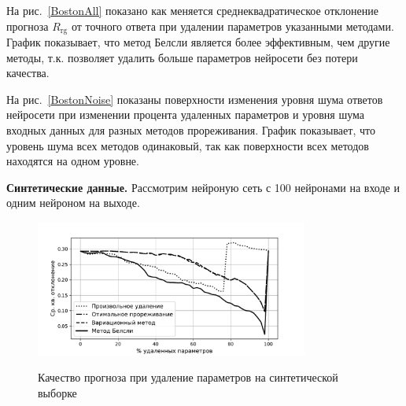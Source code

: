 На рис.~\ref{BostonAll} показано как меняется среднеквадратическое отклонение прогноза $R_{\text{rg}}$ от точного ответа  при удалении параметров указанными методами. График показывает, что метод Белсли является более эффективным, чем другие методы, т.к. позволяет удалить больше параметров нейросети без потери качества.

На рис.~\ref{BostonNoise} показаны поверхности изменения уровня шума ответов нейросети при изменении процента удаленных параметров и уровня шума входных данных для разных методов прореживания. График показывает, что уровень шума всех методов одинаковый, так как поверхности всех методов находятся на одном уровне.


\textbf{Синтетические данные.} Рассмотрим нейроную сеть с 100 нейронами на входе и одним нейроном на выходе.

\begin{figure}[h!t]\center
\includegraphics[width=0.8\textwidth]{plots/grabovoy/Data1/All.pdf}\\
\caption{Качество прогноза при удаление параметров на синтетической выборке}
\label{Data1All}
\end{figure}

